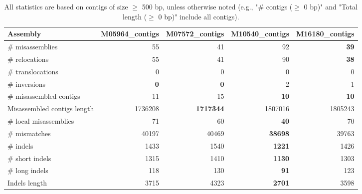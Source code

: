 \documentclass[12pt,a4paper]{article}
\begin{document}
\begin{table}[ht]
\begin{center}
\caption{All statistics are based on contigs of size $\geq$ 500 bp, unless otherwise noted (e.g., "\# contigs ($\geq$ 0 bp)" and "Total length ($\geq$ 0 bp)" include all contigs).}
\begin{tabular}{|l*{4}{|r}|}
\hline
Assembly & M05964\_contigs & M07572\_contigs & M10540\_contigs & M16180\_contigs \\ \hline
\# misassemblies & 55 & 41 & 92 & {\bf 39} \\ \hline
\hspace{5mm}\# relocations & 55 & 41 & 90 & {\bf 38} \\ \hline
\hspace{5mm}\# translocations & 0 & 0 & 0 & 0 \\ \hline
\hspace{5mm}\# inversions & {\bf 0} & {\bf 0} & 2 & 1 \\ \hline
\# misassembled contigs & 11 & 15 & {\bf 10} & {\bf 10} \\ \hline
Misassembled contigs length & 1736208 & {\bf 1717344} & 1807016 & 1805243 \\ \hline
\# local misassemblies & 71 & 60 & {\bf 40} & 70 \\ \hline
\# mismatches & 40197 & 40469 & {\bf 38698} & 39763 \\ \hline
\# indels & 1433 & 1540 & {\bf 1221} & 1426 \\ \hline
\hspace{5mm}\# short indels & 1315 & 1410 & {\bf 1130} & 1303 \\ \hline
\hspace{5mm}\# long indels & 118 & 130 & {\bf 91} & 123 \\ \hline
Indels length & 3715 & 4323 & {\bf 2701} & 3598 \\ \hline
\end{tabular}
\end{center}
\end{table}
\end{document}
